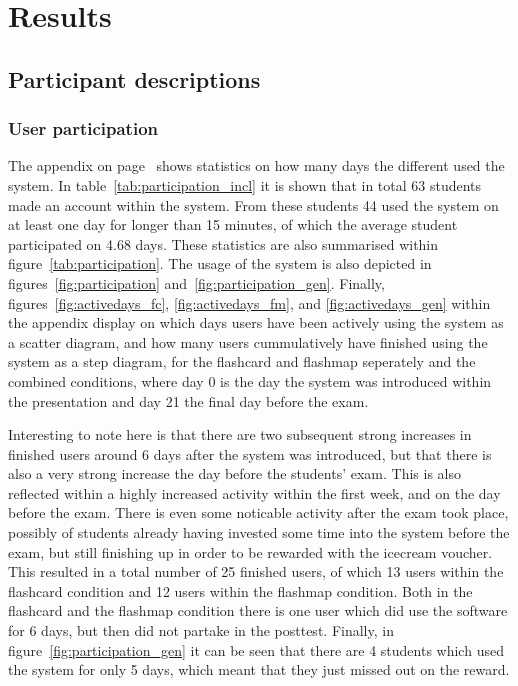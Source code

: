 \chapter{Results}
\label{ch:results}

\section{Participant descriptions}

\subsection{User participation}

The  appendix on page~\pageref{app:participation} shows statistics on how many days the different used the system. In table~\ref{tab:participation_incl} it is shown that in total 63 students made an account within the system. From these students 44 used the system on at least one day for longer than 15 minutes, of which the average student participated on 4.68 days. These statistics are also summarised within figure~\ref{tab:participation}. The usage of the system is also depicted in figures~\ref{fig:participation} and~\ref{fig:participation_gen}. Finally, figures~\ref{fig:activedays_fc}, \ref{fig:activedays_fm}, and \ref{fig:activedays_gen} within the appendix display on which days users have been actively using the system as a scatter diagram, and how many users cummulatively have finished using the system as a step diagram, for the flashcard and flashmap seperately and the combined conditions, where day 0 is the day the system was introduced within the presentation and day 21 the final day before the exam.

Interesting to note here is that there are two subsequent strong increases in finished users around 6 days after the system was introduced, but that there is also a very strong increase the day before the students' exam. This is also reflected within a highly increased activity within the first week, and on the day before the exam. There is even some noticable activity after the exam took place, possibly of students already having invested some time into the system before the exam, but still finishing up in order to be rewarded with the icecream voucher. This resulted in a total number of 25 finished users, of which 13 users within the flashcard condition and 12 users within the flashmap condition. Both in the flashcard and the flashmap condition there is one user which did use the software for 6 days, but then did not partake in the posttest. Finally, in figure~\ref{fig:participation_gen} it can be seen that there are 4 students which used the system for only 5 days, which meant that they just missed out on the reward.

